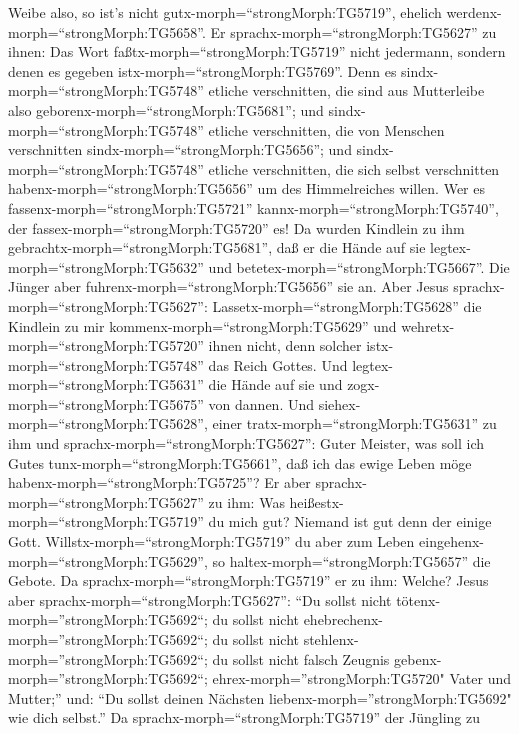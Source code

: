 Weibe also, so ist's nicht gutx-morph=``strongMorph:TG5719'', ehelich
werdenx-morph=``strongMorph:TG5658''.  Er
sprachx-morph=``strongMorph:TG5627'' zu ihnen: Das Wort
faßtx-morph=``strongMorph:TG5719'' nicht jedermann, sondern denen es
gegeben istx-morph=``strongMorph:TG5769''.  Denn es
sindx-morph=``strongMorph:TG5748'' etliche verschnitten, die sind aus
Mutterleibe also geborenx-morph=``strongMorph:TG5681''; und
sindx-morph=``strongMorph:TG5748'' etliche verschnitten, die von
Menschen verschnitten sindx-morph=``strongMorph:TG5656''; und
sindx-morph=``strongMorph:TG5748'' etliche verschnitten, die sich selbst
verschnitten habenx-morph=``strongMorph:TG5656'' um des Himmelreiches
willen. Wer es fassenx-morph=``strongMorph:TG5721''
kannx-morph=``strongMorph:TG5740'', der
fassex-morph=``strongMorph:TG5720'' es!  Da wurden Kindlein
zu ihm gebrachtx-morph=``strongMorph:TG5681'', daß er die Hände auf sie
legtex-morph=``strongMorph:TG5632'' und
betetex-morph=``strongMorph:TG5667''. Die Jünger aber
fuhrenx-morph=``strongMorph:TG5656'' sie an.  Aber Jesus
sprachx-morph=``strongMorph:TG5627'':
Lassetx-morph=``strongMorph:TG5628'' die Kindlein zu mir
kommenx-morph=``strongMorph:TG5629'' und
wehretx-morph=``strongMorph:TG5720'' ihnen nicht, denn solcher
istx-morph=``strongMorph:TG5748'' das Reich Gottes.  Und
legtex-morph=``strongMorph:TG5631'' die Hände auf sie und
zogx-morph=``strongMorph:TG5675'' von dannen.  Und
siehex-morph=``strongMorph:TG5628'', einer
tratx-morph=``strongMorph:TG5631'' zu ihm und
sprachx-morph=``strongMorph:TG5627'': Guter Meister, was soll ich Gutes
tunx-morph=``strongMorph:TG5661'', daß ich das ewige Leben möge
habenx-morph=``strongMorph:TG5725''?  Er aber
sprachx-morph=``strongMorph:TG5627'' zu ihm: Was
heißestx-morph=``strongMorph:TG5719'' du mich gut? Niemand ist gut denn
der einige Gott. Willstx-morph=``strongMorph:TG5719'' du aber zum Leben
eingehenx-morph=``strongMorph:TG5629'', so
haltex-morph=``strongMorph:TG5657'' die Gebote.  Da
sprachx-morph=``strongMorph:TG5719'' er zu ihm: Welche? Jesus aber
sprachx-morph=``strongMorph:TG5627'': ``Du sollst nicht
tötenx-morph=''strongMorph:TG5692``; du sollst nicht
ehebrechenx-morph=''strongMorph:TG5692``; du sollst nicht
stehlenx-morph=''strongMorph:TG5692``; du sollst nicht falsch Zeugnis
gebenx-morph=''strongMorph:TG5692``; 
ehrex-morph=''strongMorph:TG5720" Vater und Mutter;'' und: ``Du sollst
deinen Nächsten liebenx-morph=''strongMorph:TG5692" wie dich selbst.''
 Da sprachx-morph=``strongMorph:TG5719'' der Jüngling zu
